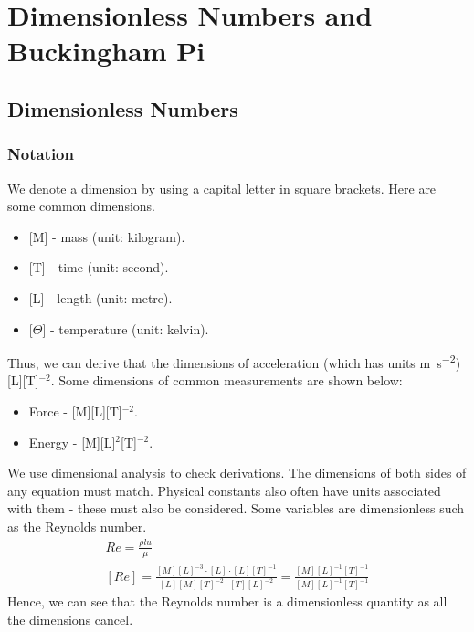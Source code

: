 \chapter{Dimensionless Numbers and Buckingham Pi}
\section{Dimensionless Numbers}
\subsection{Notation}
We denote a dimension by using a capital letter in square brackets. Here are some common dimensions.
\begin{itemize}[noitemsep]
  \item {[M]} - mass (unit: kilogram).
  \item {[T]} - time (unit: second).
  \item {[L]} - length (unit: metre).
  \item {[\(\Theta\)]} - temperature (unit: kelvin).
\end{itemize}
Thus, we can derive that the dimensions of acceleration (which has units \si{\meter\per\second\squared}) [L][T]\(^{-2}\). Some dimensions of common measurements are shown below:
\begin{itemize}[noitemsep]
  \item Force - [M][L][T]\(^{-2}\).
  \item Energy - [M][L]\(^2\)[T]\(^{-2}\).
\end{itemize}
We use dimensional analysis to check derivations. The dimensions of both sides of any equation must match. Physical constants also often have units associated with them - these must also be considered. Some variables are dimensionless such as the Reynolds number.
\begin{gather}
  Re = \frac{\rho l u}{\mu}\\
  [Re] = \frac{[M][L]^{-3}\cdot [L] \cdot [L][T]^{-1}}{[L][M][T]^{-2}\cdot [T][L]^{-2}} = \frac{[M][L]^{-1}[T]^{-1}}{[M][L]^{-1}[T]^{-1}}
\end{gather}
Hence, we can see that the Reynolds number is a dimensionless quantity as all the dimensions cancel.
